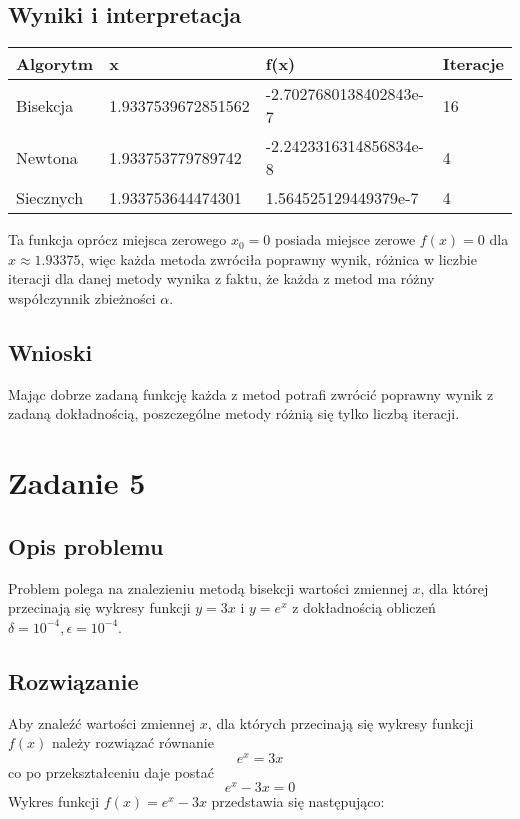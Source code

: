 \documentclass{article}
\begin{document}
\subsection{Wyniki i interpretacja}
\vspace{10pt}
\setlength{\tabcolsep}{2pt}
\renewcommand{\arraystretch}{1.6}
\begin{tabularx}{\textwidth}{|l|Y|Y|l|}
\hline
Algorytm & x & f(x) & Iteracje \\
\hline
Bisekcja & 1.9337539672851562 & -2.7027680138402843e-7 & 16 \\
\hline
Newtona & 1.933753779789742 & -2.2423316314856834e-8 & 4 \\
\hline
Siecznych & 1.933753644474301 & 1.564525129449379e-7 & 4 \\
\hline
\end{tabularx}
\vspace{15pt}

Ta funkcja oprócz miejsca zerowego $x_0 = 0$ posiada miejsce zerowe $f(x) = 0$ dla $x \approx 1.93375$, więc każda metoda zwróciła poprawny wynik, różnica w liczbie iteracji dla danej metody wynika z faktu, że każda z metod ma różny współczynnik zbieżności $\alpha$.
\subsection{Wnioski}
Mając dobrze zadaną funkcję każda z metod potrafi zwrócić poprawny wynik z zadaną dokładnością, poszczególne metody różnią się tylko liczbą iteracji.

\section{Zadanie 5}
\subsection{Opis problemu}
Problem polega na znalezieniu metodą bisekcji wartości zmiennej $x$, dla której przecinają się wykresy funkcji $y = 3x$ i $y = e^x$ z dokładnością obliczeń $\delta = 10^{-4}, \epsilon = 10^{-4}$.
\subsection{Rozwiązanie}
Aby znaleźć wartości zmiennej $x$, dla których przecinają się wykresy funkcji $f(x)$ należy rozwiązać równanie
$$ e^x = 3x $$
co po przekształceniu daje postać 
$$ e^x - 3x = 0 $$
Wykres funkcji $f(x) = e^x - 3x$ przedstawia się następująco:
\end{document}
